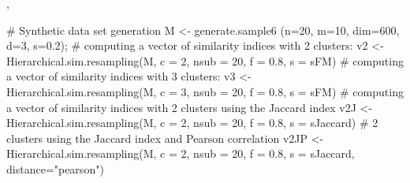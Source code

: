 \documentclass{article}
\begin{document}
\begin{SeeAlso}\relax
{}, 
\end{SeeAlso}
\begin{Examples}
\begin{ExampleCode}
# Synthetic data set generation
M <- generate.sample6 (n=20, m=10, dim=600, d=3, s=0.2);
# computing a vector of similarity indices with 2 clusters:
v2 <- Hierarchical.sim.resampling(M, c = 2, nsub = 20, f = 0.8, s = sFM)
# computing a vector of similarity indices with 3 clusters:
v3 <- Hierarchical.sim.resampling(M, c = 3, nsub = 20, f = 0.8, s = sFM)
# computing a vector of similarity indices with 2 clusters using the Jaccard index
v2J <- Hierarchical.sim.resampling(M, c = 2, nsub = 20, f = 0.8, s = sJaccard)
#  2 clusters using the Jaccard index and Pearson correlation
v2JP <- Hierarchical.sim.resampling(M, c = 2, nsub = 20, f = 0.8, s = sJaccard, 
                                    distance="pearson")
\end{ExampleCode}
\end{Examples}
\end{document}
